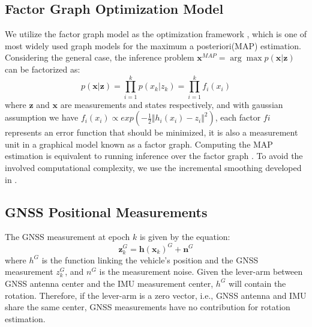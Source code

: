 \documentclass[journal,article,submit,moreauthors,pdftex]{Definitions/mdpi}
\begin{document}
\subsection{Factor Graph Optimization Model}
We utilize the factor graph model as the optimization framework \cite{loeligerIntroductionFactorGraphs2008,dellaertFactorGraphsRobot2017}, which is one of most widely used graph models for the maximum a posteriori(MAP) estimation. Considering the general case, the inference problem $\boldsymbol{x}^{MAP} = \arg\max p(\boldsymbol{x|z})$ can be factorized as:
\begin{equation}
	p(\boldsymbol{x|z}) = \prod_{i=1}^{k} p(x_{k}|z_{k}) = \prod_{i=1}^{k} f_i(x_i)
\end{equation}
where $\boldsymbol{z}$ and $\boldsymbol{x}$ are measurements and states respectively, and with gaussian assumption we have $f_i(x_i) \propto exp \left( -\frac{1}{2}\Vert h_i(x_i) -z_i \Vert^2 \right)$, each factor $fi$ represents an error function that should be minimized, it is also a measurement unit in a graphical model known as a factor graph. Computing the MAP estimation is equivalent to running inference over the factor graph \cite{indelmanInformationFusionNavigation2013}. To avoid the involved computational complexity, we use the incremental smoothing developed in \cite{kaessISAM2IncrementalSmoothing2012}.

\subsection{GNSS Positional Measurements}
The GNSS measurement at epoch $k$ is given by the equation:
\begin{equation}
    \boldsymbol{z}_k^G = \boldsymbol{h}(\boldsymbol{x}_k)^G+\boldsymbol{n}^G
\end{equation}
where $h^G$ is the function linking the vehicle's position and the GNSS measurement $z^G_k$, and $n^G$ is the measurement noise. Given the lever-arm between GNSS antenna center and  the IMU measurement center, $h^G$ will contain the rotation\cite{farrellAidedNavigationGPS2008}. Therefore, if the lever-arm is a zero vector, i.e., GNSS antenna and IMU share the same center, GNSS measurements have no contribution for rotation estimation. 
\end{document}
